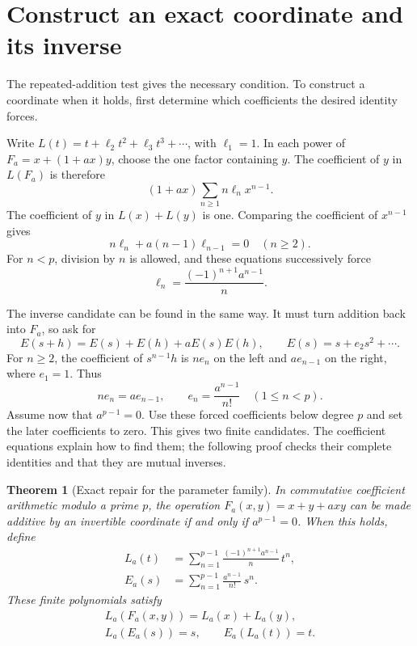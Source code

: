 \documentclass[11pt,letterpaper]{article}
\numberwithin{equation}{section}
\newtheorem{theorem}{Theorem}[section]
\theoremstyle{definition}\newtheorem{example}[theorem]{Example}
\begin{document}
\section{Construct an exact coordinate and its inverse}\label{sec:exact-theorem}

The repeated-addition test gives the necessary condition. To construct a coordinate when it holds, first determine which coefficients the desired identity forces.

Write \(L(t)=t+\ell_2t^2+\ell_3t^3+\cdots\), with \(\ell_1=1\). In each power of \(F_a=x+(1+ax)y\), choose the one factor containing \(y\). The coefficient of \(y\) in \(L(F_a)\) is therefore
\[
 (1+ax)\sum_{n\ge1}n\ell_nx^{n-1}.
\]
The coefficient of \(y\) in \(L(x)+L(y)\) is one. Comparing the coefficient of \(x^{n-1}\) gives
\begin{equation}\label{eq:coefficient-recursion}
 n\ell_n+a(n-1)\ell_{n-1}=0\quad(n\ge2).
\end{equation}
For \(n<p\), division by \(n\) is allowed, and these equations successively force
\[
 \ell_n=\frac{(-1)^{n+1}a^{n-1}}n.
\]

The inverse candidate can be found in the same way. It must turn addition back into \(F_a\), so ask for
\[
 E(s+h)=E(s)+E(h)+aE(s)E(h),\qquad
 E(s)=s+e_2s^2+\cdots.
\]
For \(n\ge2\), the coefficient of \(s^{n-1}h\) is \(ne_n\) on the left and \(ae_{n-1}\) on the right, where \(e_1=1\). Thus
\[
 ne_n=ae_{n-1},\qquad e_n=\frac{a^{n-1}}{n!}\quad(1\le n<p).
\]
Assume now that \(a^{p-1}=0\). Use these forced coefficients below degree \(p\) and set the later coefficients to zero. This gives two finite candidates. The coefficient equations explain how to find them; the following proof checks their complete identities and that they are mutual inverses.

\begin{theorem}[Exact repair for the parameter family]\label{thm:family}
In commutative coefficient arithmetic modulo a prime \(p\), the operation \(F_a(x,y)=x+y+a xy\) can be made additive by an invertible coordinate if and only if \(a^{p-1}=0\). When this holds, define
\begin{align}
 L_a(t)&=\sum_{n=1}^{p-1}\frac{(-1)^{n+1}a^{n-1}}n\,t^n,
 \label{eq:finite-log}\\
 E_a(s)&=\sum_{n=1}^{p-1}\frac{a^{n-1}}{n!}\,s^n.
 \label{eq:finite-exp}
\end{align}
These finite polynomials satisfy
\begin{gather}
 L_a(F_a(x,y))=L_a(x)+L_a(y),\label{eq:theorem-add}\\
 L_a(E_a(s))=s,\qquad E_a(L_a(t))=t.\label{eq:theorem-inverse}
\end{gather}
\end{theorem}
\end{document}
